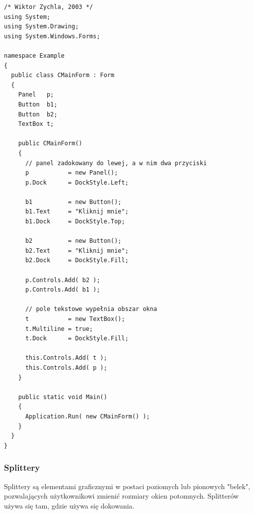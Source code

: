 \begin{scriptsize}
\begin{verbatim}
/* Wiktor Zychla, 2003 */
using System;
using System.Drawing;
using System.Windows.Forms;

namespace Example
{
  public class CMainForm : Form
  {   
    Panel   p;
    Button  b1; 
    Button  b2; 
    TextBox t;

    public CMainForm()
    {
      // panel zadokowany do lewej, a w nim dwa przyciski
      p           = new Panel();
      p.Dock      = DockStyle.Left;      

      b1          = new Button();
      b1.Text     = "Kliknij mnie";
      b1.Dock     = DockStyle.Top;

      b2          = new Button();
      b2.Text     = "Kliknij mnie";
      b2.Dock     = DockStyle.Fill;
      
      p.Controls.Add( b2 );
      p.Controls.Add( b1 );

      // pole tekstowe wypełnia obszar okna
      t           = new TextBox();
      t.Multiline = true; 
      t.Dock      = DockStyle.Fill;

      this.Controls.Add( t );
      this.Controls.Add( p );
    } 

    public static void Main()
    {
      Application.Run( new CMainForm() );
    }
  }
}
\end{verbatim}
\end{scriptsize}

\subsubsection{Splittery}

Splittery są elementami graficznymi w postaci poziomych lub pionowych "belek", pozwalających
użytkownikowi zmienić rozmiary okien potomnych. Splitterów używa się tam, gdzie używa się dokowania.

